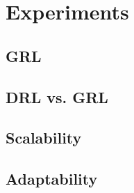 \section{Experiments}

\subsection{GRL}

\subsection{DRL vs. GRL}

\subsection{Scalability}

\subsection{Adaptability}


